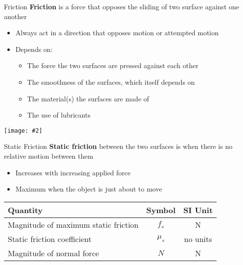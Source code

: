 \documentclass[12pt,compress,aspectratio=169]{beamer}
\newcommand{\pic}[2]{\texttt{[image: \#2]}}
\newcommand{\eq}[2]{\vspace{#1}{\Large\begin{displaymath}#2\end{displaymath}}}
\begin{document}
\begin{frame}{Friction}
  \textbf{Friction} is a force that opposes the sliding of two surface against
  one another
  \begin{itemize}
  \item Always act in a direction that opposes motion or attempted motion
  \item Depends on:
    \begin{itemize}
    \item The force the two surfaces are pressed against each other
    \item The smoothness of the surfaces, which itself depends on
    \item The material(s) the surfaces are made of
    \item The use of lubricants
    \end{itemize}
  \end{itemize}
  \begin{center}
    \pic{.6}{graphics/friction}
  \end{center}
\end{frame}



\begin{frame}{Static Friction}
  \textbf{Static friction} between the two surfaces is when there is no
  relative motion between them
  \begin{itemize}
  \item Increases with increasing applied force
  \item Maximum when the object is just about to move
  \end{itemize}

  \eq{-.35in}{
    \boxed{f_s\leq\mu_sN}
  }
  \begin{center}
    \begin{tabular}{l|c|c}
      \rowcolor{pink}
      \textbf{Quantity} & \textbf{Symbol} & \textbf{SI Unit} \\ \hline
      Magnitude of maximum static friction & $f_s$ & \si{\newton} \\
      Static friction coefficient  & $\mu_s$ & no units \\
      Magnitude of normal force    & $N$ & \si{\newton}
    \end{tabular}
  \end{center}
\end{frame}
\end{document}
